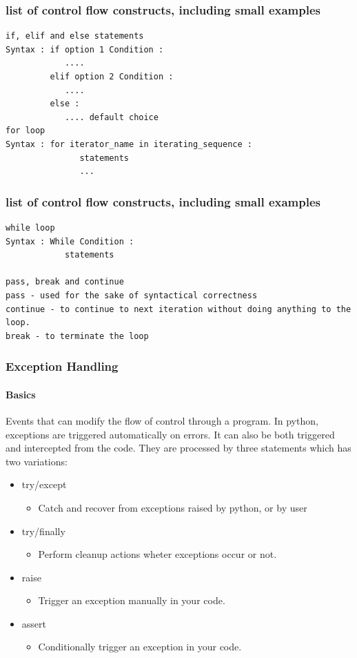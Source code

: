 \documentclass{beamer}
\begin{document}
\begin{frame}[fragile] %
\frametitle{list of control flow constructs, including small examples}
\begin{example}
\begin{verbatim}
if, elif and else statements
Syntax : if option 1 Condition :
            ....
         elif option 2 Condition :
            ....
         else :
            .... default choice   
for loop
Syntax : for iterator_name in iterating_sequence :
               statements
               ...
\end{verbatim}
\end{example}  
\end{frame}  
          
\begin{frame}[fragile] %
\frametitle{list of control flow constructs, including small examples}
\begin{example}
\begin{verbatim}
while loop
Syntax : While Condition :
            statements 

pass, break and continue
pass - used for the sake of syntactical correctness
continue - to continue to next iteration without doing anything to the loop.
break - to terminate the loop

\end{verbatim}
\end{example}
\end{frame}

\begin{frame}
\frametitle{Exception Handling}
\framesubtitle{Basics}
Events that can modify the flow of control through a program.
In python, exceptions are triggered automatically on errors. It can also be both triggered and intercepted from the code. They are processed by three statements which has two variations:
\begin{itemize}
\item try/except
	\begin{itemize}
	\item Catch and recover from exceptions raised by python, or by user
	\end{itemize}
\item try/finally
	\begin{itemize}
	\item Perform cleanup actions wheter exceptions occur or not.
	\end{itemize}
\item raise
	\begin{itemize}
	\item Trigger an exception manually in your code.
	\end{itemize}
\item assert
	\begin{itemize}
	\item Conditionally trigger an exception in your code.
	\end{itemize}
\end{itemize}
  
\end{frame}
\end{document}
